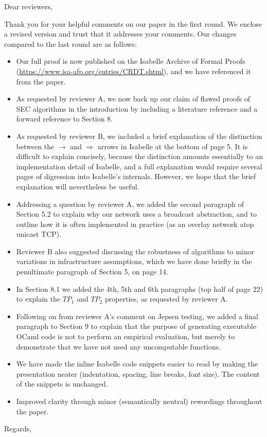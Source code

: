 \documentclass{letter}
\begin{document}
\begin{letter}{}
\opening{Dear reviewers,}

Thank you for your helpful comments on our paper in the first round.
We enclose a revised version and trust that it addresses your comments.
Our changes compared to the last round are as follows:

\begin{itemize}
\item Our full proof is now published on the Isabelle Archive of Formal Proofs (\url{https://www.isa-afp.org/entries/CRDT.shtml}), and we have referenced it from the paper.
\item As requested by reviewer A, we now back up our claim of flawed proofs of SEC algorithms in the introduction by including a literature reference and a forward reference to Section 8.
\item As requested by reviewer B, we included a brief explanation of the distinction between the $\longrightarrow$ and $\Longrightarrow$ arrows in Isabelle at the bottom of page 5.
It is difficult to explain concisely, because the distinction amounts essentially to an implementation detail of Isabelle, and a full explanation would require several pages of digression into Isabelle's internals.
However, we hope that the brief explanation will nevertheless be useful.
\item Addressing a question by reviewer A, we added the second paragraph of Section 5.2 to explain why our network uses a broadcast abstraction, and to outline how it is often implemented in practice (as an overlay network atop unicast TCP).
\item Reviewer B also suggested discussing the robustness of algorithms to minor variations in infrastructure assumptions, which we have done briefly in the penultimate paragraph of Section 5, on page 14.
\item In Section 8.1 we added the 4th, 5th and 6th paragraphs (top half of page 22) to explain the $\mathit{TP}_1$ and $\mathit{TP}_2$ properties, as requested by reviewer A.
\item Following on from reviewer A's comment on Jepsen testing, we added a final paragraph to Section 9 to explain that the purpose of generating executable OCaml code is not to perform an empirical evaluation, but merely to demonstrate that we have not used any uncomputable functions.
\item We have made the inline Isabelle code snippets easier to read by making the presentation neater (indentation, spacing, line breaks, font size).
The content of the snippets is unchanged.
\item Improved clarity through minor (semantically neutral) rewordings throughout the paper.
\end{itemize}

\closing{Regards,}
\end{letter}
\end{document}
